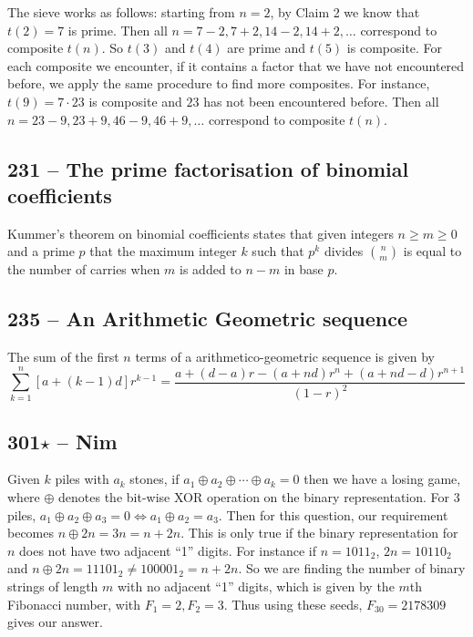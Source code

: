 \documentclass{article}
\begin{document}
The sieve works as follows: starting from $n=2$, by Claim 2 we know that $t(2) = 7$ is prime.
Then all $n = 7-2, 7+2, 14-2, 14+2, \dotsc$ correspond to composite $t(n)$.
So $t(3)$ and $t(4)$ are prime and $t(5)$ is composite.
For each composite we encounter, if it contains a factor that we have not encountered before, we apply the same procedure to find more composites.
For instance, $t(9) = 7 \cdot 23$ is composite and $23$ has not been encountered before.
Then all $n = 23-9, 23+9, 46-9, 46+9, \dotsc$ correspond to composite $t(n)$. 

\subsection*{231 -- The prime factorisation of binomial coefficients} 
Kummer's theorem on binomial coefficients states that given integers $n \geq m \geq 0$ and a prime $p$ that the maximum integer $k$ such that $p^k$ divides $\binom{n}{m}$ is equal to the number of carries when $m$ is added to $n-m$ in base $p$.

\subsection*{235 -- An Arithmetic Geometric sequence} 
The sum of the first $n$ terms of a arithmetico-geometric sequence is given by
\[ \sum\limits_{k=1}^n [a+(k-1)d]r^{k-1} = \frac{a + (d-a)r - (a+nd)r^n +(a+nd-d)r^{n+1}}{(1-r)^2}\]

\subsection*{301$\star$ -- Nim} 
Given $k$ piles with $a_k$ stones, if $a_1 \oplus a_2 \oplus \dotsb \oplus a_k = 0$ then we have a losing game, where $\oplus$ denotes the bit-wise XOR operation on the binary representation. 
For 3 piles, $a_1 \oplus a_2 \oplus a_3 = 0 \iff a_1 \oplus a_2 = a_3$. 
Then for this question, our requirement becomes $n \oplus 2n = 3n = n + 2n$. 
This is only true if the binary representation for $n$ does not have two adjacent ``1'' digits. 
For instance if $n = 1011_2$, $2n = 10110_2$ and $n \oplus 2n = 11101_2 \neq 100001_2 = n+2n$. 
So we are finding the number of binary strings of length $m$ with no adjacent ``1'' digits, which is given by the $m$th Fibonacci number, with $F_1 = 2, F_2 = 3$. 
Thus using these seeds, $F_{30} = \boxed{2178309}$ gives our answer.
\end{document}
